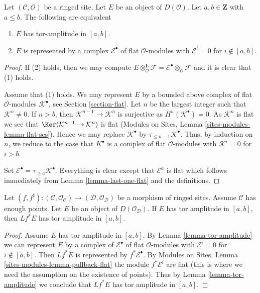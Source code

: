 \begin{lemma}
\label{lemma-tor-amplitude}
Let $(\mathcal{C}, \mathcal{O})$ be a ringed site. Let $E$ be an object of
$D(\mathcal{O})$. Let $a, b \in \mathbf{Z}$ with $a \leq b$. The following
are equivalent
\begin{enumerate}
\item $E$ has tor-amplitude in $[a, b]$.
\item $E$ is represented by a complex
$\mathcal{E}^\bullet$ of flat $\mathcal{O}$-modules with
$\mathcal{E}^i = 0$ for $i \not \in [a, b]$.
\end{enumerate}
\end{lemma}

\begin{proof}
If (2) holds, then we may compute
$E \otimes_\mathcal{O}^\mathbf{L} \mathcal{F} =
\mathcal{E}^\bullet \otimes_\mathcal{O} \mathcal{F}$
and it is clear that (1) holds.

\medskip\noindent
Assume that (1) holds. We may represent $E$ by a bounded above complex
of flat $\mathcal{O}$-modules $\mathcal{K}^\bullet$, see
Section \ref{section-flat}.
Let $n$ be the largest integer such that $\mathcal{K}^n \not = 0$.
If $n > b$, then $\mathcal{K}^{n - 1} \to \mathcal{K}^n$ is surjective as
$H^n(\mathcal{K}^\bullet) = 0$. As $\mathcal{K}^n$ is flat we see that
$\Ker(\mathcal{K}^{n - 1} \to \mathcal{K}^n)$ is flat
(Modules on Sites, Lemma \ref{sites-modules-lemma-flat-ses}).
Hence we may replace $\mathcal{K}^\bullet$ by
$\tau_{\leq n - 1}\mathcal{K}^\bullet$. Thus, by induction on $n$, we
reduce to the case that $K^\bullet$ is a complex of flat
$\mathcal{O}$-modules with $\mathcal{K}^i = 0$ for $i > b$.

\medskip\noindent
Set $\mathcal{E}^\bullet = \tau_{\geq a}\mathcal{K}^\bullet$.
Everything is clear except that $\mathcal{E}^a$ is flat
which follows immediately from Lemma \ref{lemma-last-one-flat}
and the definitions.
\end{proof}

\begin{lemma}
\label{lemma-tor-amplitude-pullback}
Let $(f, f^\sharp) : (\mathcal{C}, \mathcal{O}_\mathcal{C}) \to
(\mathcal{D}, \mathcal{O}_\mathcal{D})$
be a morphism of ringed sites. Assume $\mathcal{C}$ has enough points.
Let $E$ be an object of $D(\mathcal{O}_\mathcal{D})$.
If $E$ has tor amplitude in $[a, b]$,
then $Lf^*E$ has tor amplitude in $[a, b]$.
\end{lemma}

\begin{proof}
Assume $E$ has tor amplitude in $[a, b]$. By
Lemma \ref{lemma-tor-amplitude}
we can represent $E$ by a complex of
$\mathcal{E}^\bullet$ of flat $\mathcal{O}$-modules with
$\mathcal{E}^i = 0$ for $i \not \in [a, b]$. Then
$Lf^*E$ is represented by $f^*\mathcal{E}^\bullet$.
By Modules on Sites, Lemma \ref{sites-modules-lemma-pullback-flat}
the module $f^*\mathcal{E}^i$ are flat (this is where we need
the assumption on the existence of points).
Thus by Lemma \ref{lemma-tor-amplitude}
we conclude that $Lf^*E$ has tor amplitude in $[a, b]$.
\end{proof}

